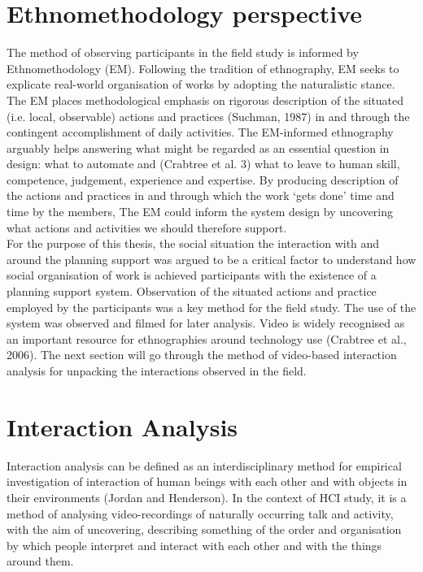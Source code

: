 \section{Ethnomethodology perspective}
The method of observing participants in the field study is informed by Ethnomethodology (EM). Following the tradition of ethnography, EM seeks to explicate real-world organisation of works by adopting the naturalistic stance. The EM places methodological emphasis on rigorous description of the situated (i.e. local, observable) actions and practices (Suchman, 1987) in and through the contingent accomplishment of daily activities. The EM-informed ethnography arguably helps answering what might be regarded as an essential question in design: what to automate and (Crabtree et al. 3) what to leave to human skill, competence, judgement, experience and expertise. By producing description of the actions and practices in and through which the work `gets done' time and time by the members, The EM could inform the system design by uncovering what actions and activities we should therefore support.\\

For the purpose of this thesis, the social situation the interaction with and around the planning support was argued to be a critical factor to understand how social organisation of work is achieved participants with the existence of a planning support system. Observation of the situated actions and practice employed by the participants was a key method for the field study. The use of the system was observed and filmed for later analysis. Video is widely recognised as an important resource for ethnographies around technology use (Crabtree et al., 2006). The next section will go through the method of video-based interaction analysis for unpacking the interactions observed in the field. \\

\section{Interaction Analysis}
Interaction analysis can be defined as an interdisciplinary method for empirical investigation of interaction of human beings with each other and with objects in their environments (Jordan and Henderson). In the context of HCI study, it is a method of analysing video-recordings of naturally occurring talk and activity, with the aim of uncovering, describing something of the order and organisation by which people interpret and interact with each other and with the things around them.\\

